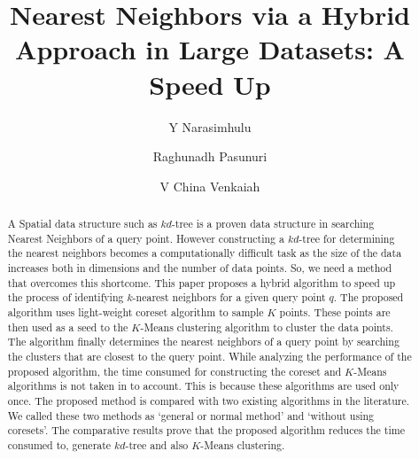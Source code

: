 \documentclass[runningheads]{llncs}
\begin{document}
%
\title{Nearest Neighbors via a Hybrid Approach in Large Datasets: A Speed Up}
%
%
\author{Y Narasimhulu \and
Raghunadh Pasunuri \and
V China Venkaiah}
%
%
%
\maketitle              %
%
\begin{abstract}
A Spatial data structure such as $kd$-tree is a proven data structure in searching Nearest Neighbors of a query point. However constructing a $kd$-tree for determining the nearest neighbors becomes a computationally difficult task as the size of the data increases both in dimensions and the number of data points. So, we need a method that overcomes this shortcome. This paper proposes a hybrid algorithm to speed up the process of identifying $k$-nearest neighbors for a given query point $q$. The proposed algorithm uses light-weight coreset algorithm to sample $K$ points. These points are then used as a seed to the $K$-Means clustering algorithm to cluster the data points. The algorithm finally determines the nearest neighbors of a query point by searching the clusters that are closest to the query point. While analyzing the performance of the proposed algorithm, the time consumed for constructing the coreset and $K$-Means algorithms is not taken in to account. This is because these algorithms are used only once. The proposed method is compared with two existing algorithms in the literature. We called these two methods as `general or normal method' and `without using coresets'. The  comparative results prove that the proposed algorithm reduces the time consumed to, generate $kd$-tree and also $K$-Means clustering.

\end{abstract}
%
%
%
\end{document}

